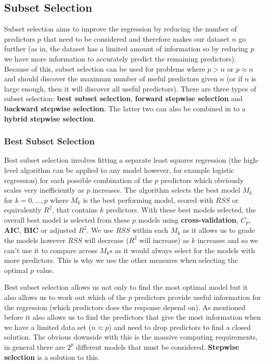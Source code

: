 \subsection{Subset Selection}

Subset selection aims to improve the regression by reducing the number of predictors $p$ that need to be considered and therefore makes our dataset $n$ go further (as in, the dataset has a limited amount of information so by reducing $p$ we have more information to accurately predict the remaining predictors). Because of this, subset selection can be used for problems where $p>n$ or $p\approx n$ and should discover the maximum number of useful predictors given $n$ (or if $n$ is large enough, then it will discover all useful predictors). There are three types of subset selection: \textbf{best subset selection}, \textbf{forward stepwise selection} and \textbf{backward stepwise selection}. The latter two can also be combined in to a \textbf{hybrid stepwise selection}.

\subsubsection{Best Subset Selection}

Best subset selection involves fitting a separate least squares regression (the high-level algorithm can be applied to any model however, for example logistic regression) for each possible combination of the $p$ predictors which obviously scales very inefficiently as $p$ increases. The algorithm selects the best model $M_{k}$ for $k=0,...,p$ where $M_{k}$ is the best performing model, scored with $RSS$ or equivalently $R^{2}$, that contains $k$ predictors. With these best models selected, the overall best model is selected from these $p$ models using \textbf{cross-validation}, $C_{p}$, \textbf{AIC}, \textbf{BIC} or adjusted $R^{2}$. We use $RSS$ within each $M_{k}$ as it allows us to grade the models however $RSS$ will decrease ($R^{2}$ will increase) as $k$ increases and so we can't use it to compare across $M_{k}$s as it would always select for the models with more predictors. This is why we use the other measures when selecting the optimal $p$ value.

Best subset selection allows us not only to find the most optimal model but it also allows us to work out which of the $p$ predictors provide useful information for the regression (which predictors does the response depend on). As mentioned before it also allows us to find the predictors that give the most information when we have a limited data set ($n\approx p$) and need to drop predictors to find a closed solution. The obvious downside with this is the massive computing requirements, in general there are $2^{p}$ different models that must be considered. \textbf{Stepwise selection} is a solution to this.

